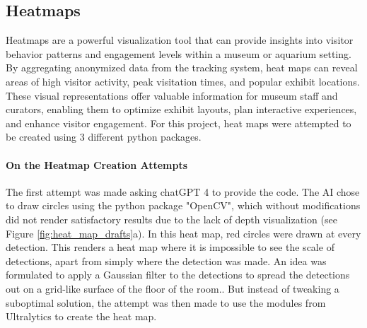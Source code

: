 \subsection{Heatmaps}
\label{sec:heat maps}
Heatmaps are a powerful visualization tool that can provide insights into visitor behavior patterns and engagement levels within a museum or aquarium setting. By aggregating anonymized data from the tracking system, heat maps can reveal areas of high visitor activity, peak visitation times, and popular exhibit locations. These visual representations offer valuable information for museum staff and curators, enabling them to optimize exhibit layouts, plan interactive experiences, and enhance visitor engagement. For this project, heat maps were attempted to be created using 3 different python packages.

\paragraph{On the Heatmap Creation Attempts}
The first attempt was made asking chatGPT 4 to provide the code. The AI chose to draw circles using the python package "OpenCV", which without modifications did not render satisfactory results due to the lack of depth visualization (see Figure \ref{fig:heat_map_drafts}a). In this heat map, red circles were drawn at every detection. This renders a heat map where it is impossible to see the scale of detections, apart from simply where the detection was made. An idea was formulated to apply a Gaussian filter to the detections to spread the detections out on a grid-like surface of the floor of the room.. But instead of tweaking a suboptimal solution, the attempt was then made to use the modules from Ultralytics to create the heat map. 

